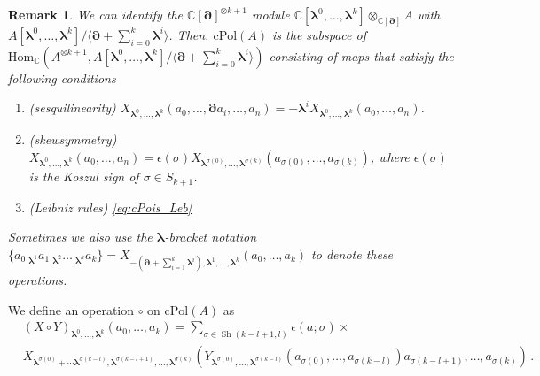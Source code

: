 \documentclass[11pt]{article}
\newcommand{\C}{\mathbb{C}}
\numberwithin{equation}{section}
\newtheorem{remark}{Remark}[section]
\begin{document}
\begin{remark}\label{rmk:chiral_Pbra}
	We can identify the $\C[\boldsymbol{\partial}]^{\otimes k+1}$ module $ \C[\boldsymbol{\lambda}^{0}, \dots, \boldsymbol{\lambda}^{k}] \otimes_{\C[\boldsymbol{\partial}]} A$ with $A[\boldsymbol{\lambda}^{0}, \dots, \boldsymbol{\lambda}^{k}]/\langle\boldsymbol{\partial} + \sum_{i=0}^{k}\boldsymbol{\lambda}^i \rangle$. Then, $\mathrm{cPol}(A)$ is the subspace of $\mathrm{Hom}_{\C}(A^{\otimes k+1}, A[\boldsymbol{\lambda}^{0}, \dots, \boldsymbol{\lambda}^{k}]/\langle\boldsymbol{\partial} + \sum_{i=0}^{k}\boldsymbol{\lambda}^i \rangle)$ consisting of maps that satisfy the following conditions
 
	\begin{enumerate}
	\item(sesquilinearity) $
		X_{\boldsymbol{\lambda}^0,\dots,\boldsymbol{\lambda}^k}(a_0, \dots, \boldsymbol{\partial} a_i, \dots, a_n) = -\boldsymbol{\lambda}^iX_{\boldsymbol{\lambda}^0,\dots,\boldsymbol{\lambda}^k}(a_0, \dots, a_n)$.
	\item(skewsymmetry) $X_{\boldsymbol{\lambda}^0,\dots,\boldsymbol{\lambda}^k}(a_0,\dots, a_n) = \epsilon(\sigma)X_{\boldsymbol{\lambda}^{\sigma(0)},\dots,\boldsymbol{\lambda}^{\sigma(k)}}(a_{\sigma(0)}, \dots, a_{\sigma(k)})$, where $\epsilon(\sigma)$ is the Koszul sign of $\sigma \in S_{k+1}$.
	\item(Leibniz rules)  \eqref{eq:cPois_Leb}
	\end{enumerate}
	Sometimes we also use the $\boldsymbol{\lambda}$-bracket notation $\{a_0~\!_{\boldsymbol{\lambda}^1}a_1~\!_{\boldsymbol{\lambda}^2}\dots~\!_{\boldsymbol{\lambda}^k}a_k\} = X_{-(\boldsymbol{\partial}+\sum_{i=1}^k\boldsymbol{\lambda}^i),\boldsymbol{\lambda}^1,\dots,\boldsymbol{\lambda}^k}(a_0,\dots, a_k)$ to denote these operations.
\end{remark}
We define an operation $\circ$ on $\mathrm{cPol}(A)$ as
\begin{equation}
	\begin{aligned}
		&(X \circ Y)_{\boldsymbol{\lambda}^0,\ldots,\boldsymbol{\lambda}^k}(a_0,\ldots,a_k) = \sum_{\sigma \in \operatorname{Sh}(k-l+1,l)}\epsilon(a;\sigma)\times \\
 & X_{\boldsymbol{\lambda}^{\sigma(0)}+\cdots\boldsymbol{\lambda}^{\sigma(k-l)},\boldsymbol{\lambda}^{\sigma(k-l+1)},\dots,\boldsymbol{\lambda}^{\sigma(k)}}\left(
Y_{\boldsymbol{\lambda}^{\sigma(0)},\dots,\boldsymbol{\lambda}^{\sigma(k-l)}}
(a_{\sigma(0)},\dots,a_{\sigma(k-l)})a_{\sigma(k-l+1)},\dots,a_{\sigma(k)}\right)\,.
\end{aligned}
\end{equation}
\end{document}
